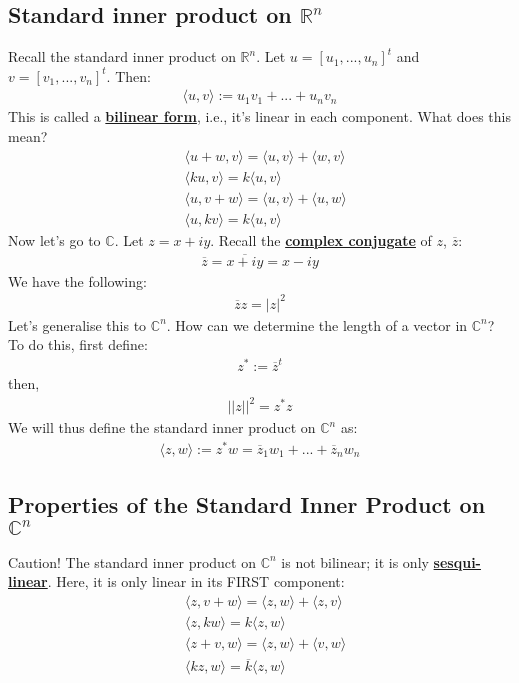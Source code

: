 \documentclass[11pt]{scrartcl}
\newcommand{\R}[0]{\mathbb{R}}
\theoremstyle{definition}
\theoremstyle{remark}
\newcommand{\dfn}[1]{\textbf{\underline{#1}}}
\newcommand{\C}[0]{\mathbb{C}}
\begin{document}
\subsection{Standard inner product on $\R^n$}
Recall the standard inner product on $\R^n$. Let $u = [u_1, ..., u_n]^t$ and $v = [v_1, ..., v_n]^t$. Then: 
\begin{align}
	\langle u, v \rangle := u_1 v_1 + ... + u_n v_n 
\end{align}
This is called a \dfn{bilinear form}, i.e., it's linear in each component. What does this mean?
\begin{align}
	& \langle u+w , v \rangle = \langle u, v \rangle + \langle w, v \rangle \\
	& \langle ku, v \rangle = k \langle u, v \rangle \\
	& \langle u, v +w \rangle = \langle u, v \rangle + \langle u, w \rangle \\
	& \langle u, kv \rangle = k \langle u, v \rangle	
\end{align}
Now let's go to $\C$. Let $z = x + iy$. Recall the \dfn{complex conjugate} of $z$, $\overline{z}$: 
\begin{align}
	\overline{z} = \overline{x+iy} = x-iy 	
\end{align}
We have the following: 
\begin{align}
	\overline{z} z = | z |^2	
\end{align}
Let's generalise this to $\C^n$. How can we determine the length of a vector in $\C^n$? To do this, first define: 
\begin{align}
	z^* := \overline{z}^t 	
\end{align}
then, 
\begin{align}
	|| z ||^2 = z^* z 	
\end{align}
We will thus define the standard inner product on $\C^n$ as: 
\begin{align}
	\langle z, w \rangle := z^* w = \overline{z}_1 w_1 + ... + \overline{z}_n w_n 	
\end{align}
\subsection{Properties of the Standard Inner Product on $\C^n$}
Caution! The standard inner product on $\C^n$ is not bilinear; it is only \dfn{sesqui-linear}. Here, it is only linear in its FIRST component: 
\begin{align}
	& \langle z, v + w \rangle = \langle z, w \rangle + \langle z, v \rangle \\
	& \langle z, kw \rangle = k \langle z, w \rangle \\
	& \langle z + v, w \rangle = \langle z, w \rangle + \langle v, w \rangle \\
	& \langle kz, w \rangle = \overline{k} \langle z, w \rangle 	
\end{align}
\end{document}

